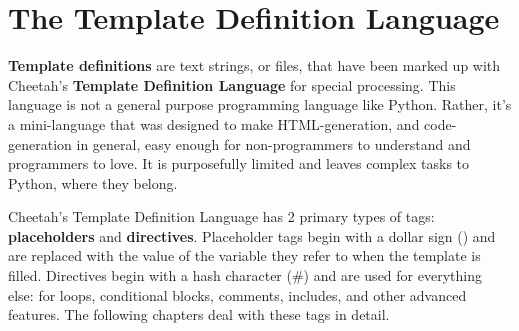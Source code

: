 \section{The Template Definition Language}



{\bf Template definitions} are text strings, or files, that have been marked up
with Cheetah's {\bf Template Definition Language} for special processing.  This
language is not a general purpose programming language like Python.  Rather,
it's a mini-language that was designed to make HTML-generation, and
code-generation in general, easy enough for non-programmers to understand and
programmers to love.  It is purposefully limited and leaves complex tasks to
Python, where they belong.

Cheetah's Template Definition Language has 2 primary types of tags: {\bf
  placeholders} and {\bf directives}. Placeholder tags begin with a dollar sign
() and are replaced with the value of the variable they refer to
when the template is filled. Directives begin with a hash character (\#) and are
used for everything else: for loops, conditional blocks, comments, includes, and
other advanced features. The following chapters deal with these tags in detail.

